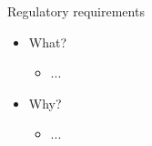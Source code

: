 \begin{Slide}{Regulatory requirements}
\begin{itemize}
\item What?
\begin{itemize}
\item ...
\end{itemize}
\item Why?
\begin{itemize}
\item ...

\end{itemize}
\end{itemize}
\end{Slide}